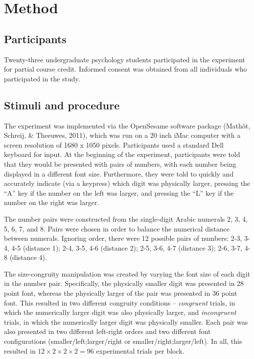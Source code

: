 \documentclass[english,man]{apa6}
\theoremstyle{definition}
\theoremstyle{definition}
\theoremstyle{definition}
\theoremstyle{remark}
\begin{document}
\section{Method}\label{method}

\subsection{Participants}\label{participants}

Twenty-three undergraduate psychology students participated in the
experiment for partial course credit. Informed consent was obtained from
all individuals who participated in the study.

\subsection{Stimuli and procedure}\label{stimuli-and-procedure}

The experiment was implemented via the OpenSesame software package
(Mathôt, Schreij, \& Theeuwes, 2011), which was run on a 20 inch iMac
computer with a screen resolution of 1680 x 1050 pixels. Participants
used a standard Dell keyboard for input. At the beginning of the
experiment, participants were told that they would be presented with
pairs of numbers, with each number being displayed in a different font
size. Furthermore, they were told to quickly and accurately indicate
(via a keypress) which digit was physically larger, pressing the
\enquote{A} key if the number on the left was larger, and pressing the
\enquote{L} key if the number on the right was larger.

The number pairs were constructed from the single-digit Arabic numerals
2, 3, 4, 5, 6, 7, and 8. Pairs were chosen in order to balance the
numerical distance between numerals. Ignoring order, there were 12
possible pairs of numbers: 2-3, 3-4, 4-5 (distance 1); 2-4, 3-5, 4-6
(distance 2); 2-5, 3-6, 4-7 (distance 3); 2-6, 3-7, 4-8 (distance 4).

The size-congruity manipulation was created by varying the font size of
each digit in the number pair. Specifically, the physically smaller
digit was presented in 28 point font, whereas the physically larger of
the pair was presented in 36 point font. This resulted in two different
congruity conditions -- \emph{congruent} trials, in which the
numerically larger digit was also physically larger, and
\emph{incongruent} trials, in which the numerically larger digit was
physically smaller. Each pair was also presented in two different
left-right orders and two different font configurations
(smaller/left;larger/right or smaller/right;larger/left). In all, this
resulted in \(12 \times 2 \times 2 \times 2 = 96\) experimental trials
per block.
\end{document}
